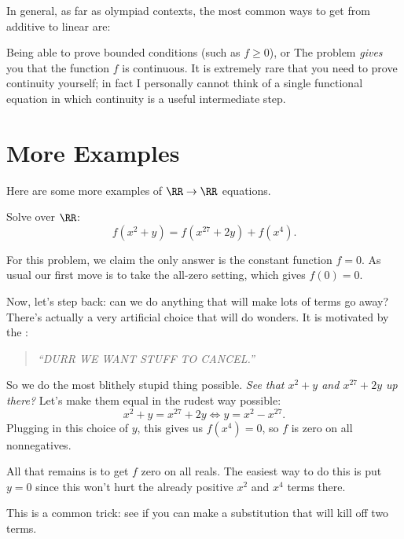 \documentclass[11pt]{scrartcl}
\begin{document}
In general, as far as olympiad contexts, the most common ways
to get from additive to linear are:
\begin{itemize}
  \ii Being able to prove bounded conditions (such as $f \ge 0$), or
  \ii The problem \emph{gives} you that the function $f$ is continuous.
  It is extremely rare that you need to prove continuity yourself;
  in fact I personally cannot think of a single functional equation in which
  continuity is a useful intermediate step.
\end{itemize}

\section{More Examples}
Here are some more examples of $\RR \to \RR$ equations.
\begin{example}
   \label{ex:david_yang}
  Solve over $\RR$: \[ f(x^2+y) = f(x^{27} + 2y) + f(x^4). \]
\end{example}
\begin{soln}
  For this problem, we claim the only answer is the constant function $f=0$.
  As usual our first move is to take the all-zero setting, which gives $f(0) = 0$.

  Now, let's step back: can we do anything that will make lots of terms go away?
  There's actually a very artificial choice that will do wonders.
  It is motivated by the :
  \begin{quote}
    \itshape ``DURR WE WANT STUFF TO CANCEL.''
  \end{quote}
  So we do the most blithely stupid thing possible.
  \emph{See that $x^2+y$ and $x^{27}+2y$ up there?}
  Let's make them equal in the rudest way possible:
  \[ x^2 + y = x^{27} + 2y \iff y = x^2 - x^{27}. \]
  Plugging in this choice of $y$,
  this gives us $f(x^4) = 0$, so $f$ is zero on all nonnegatives.

  All that remains is to get $f$ zero on all reals.
  The easiest way to do this is put $y=0$ since this won't
  hurt the already positive $x^2$ and $x^4$ terms there.
\end{soln}
This is a common trick: see if you can make a substitution that will kill off two terms.
\end{document}
